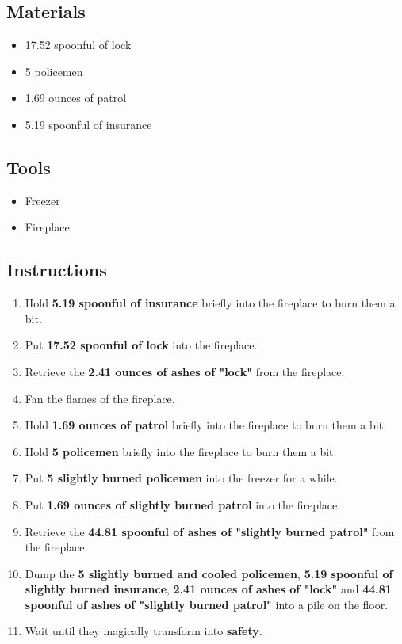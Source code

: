 \documentclass{article}
\begin{document}
\subsection{Materials}\begin{itemize}
\item 
17.52 spoonful of lock
\item 
5 policemen
\item 
1.69 ounces of patrol
\item 
5.19 spoonful of insurance
\end{itemize}
\subsection{Tools}\begin{itemize}
\item 
Freezer
\item 
Fireplace
\end{itemize}
\subsection{Instructions}\begin{enumerate}
\item 
Hold \textbf{5.19 spoonful of insurance} briefly into the fireplace to burn them a bit.
\item 
Put \textbf{17.52 spoonful of lock} into the fireplace.
\item 
Retrieve the \textbf{2.41 ounces of ashes of "lock"} from the fireplace.
\item 
Fan the flames of the fireplace.
\item 
Hold \textbf{1.69 ounces of patrol} briefly into the fireplace to burn them a bit.
\item 
Hold \textbf{5 policemen} briefly into the fireplace to burn them a bit.
\item 
Put \textbf{5 slightly burned policemen} into the freezer for a while.
\item 
Put \textbf{1.69 ounces of slightly burned patrol} into the fireplace.
\item 
Retrieve the \textbf{44.81 spoonful of ashes of "slightly burned patrol"} from the fireplace.
\item 
Dump the \textbf{5 slightly burned and cooled policemen}, \textbf{5.19 spoonful of slightly burned insurance}, \textbf{2.41 ounces of ashes of "lock"} and \textbf{44.81 spoonful of ashes of "slightly burned patrol"} into a pile on the floor.
\item 
Wait until they magically transform into \textbf{safety}.
\end{enumerate}
\newpage
\end{document}
